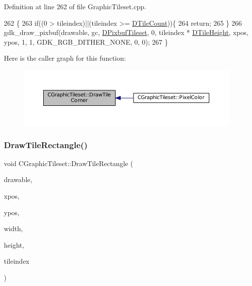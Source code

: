 Definition at line 262 of file Graphic\+Tileset.\+cpp.


\begin{DoxyCode}
262                                                                                                          \{
263     \textcolor{keywordflow}{if}((0 > tileindex)||(tileindex >= \hyperlink{classCGraphicTileset_a39d942b370e47f441bf97385eb1037c8}{DTileCount}))\{
264         \textcolor{keywordflow}{return};
265     \}
266     gdk\_draw\_pixbuf(drawable, gc, \hyperlink{classCGraphicTileset_a5d5adfcdbb347a6df3f57535ca08e3ef}{DPixbufTileset}, 0, tileindex * 
      \hyperlink{classCGraphicTileset_af48f32e07d5fe69afd5f764318cc3244}{DTileHeight}, xpos, ypos, 1, 1, GDK\_RGB\_DITHER\_NONE, 0, 0);
267 \}
\end{DoxyCode}
Here is the caller graph for this function\+:
\nopagebreak
\begin{figure}[H]
\begin{center}
\leavevmode
\includegraphics[width=350pt]{classCGraphicTileset_abf87dd71c8bf50b8878c66a5bdb2c7e7_icgraph}
\end{center}
\end{figure}
\hypertarget{classCGraphicTileset_a81114be934d1efca29eb194fc2429658}{}\label{classCGraphicTileset_a81114be934d1efca29eb194fc2429658} 
\subsubsection{\texorpdfstring{Draw\+Tile\+Rectangle()}{DrawTileRectangle()}}
{\footnotesize\ttfamily void C\+Graphic\+Tileset\+::\+Draw\+Tile\+Rectangle (\begin{DoxyParamCaption}\item[{Gdk\+Drawable $\ast$}]{drawable,  }\item[{gint}]{xpos,  }\item[{gint}]{ypos,  }\item[{gint}]{width,  }\item[{gint}]{height,  }\item[{int}]{tileindex }\end{DoxyParamCaption})}



